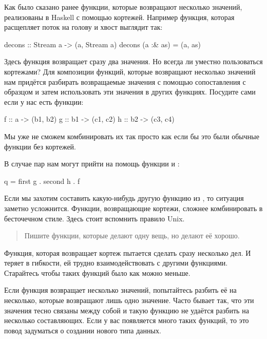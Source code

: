  Как было сказано ранее функции, которые возвращают
несколько значений, реализованы в Haskell с помощью кортежей. Например
функция, которая расщепляет поток на голову и хвост выглядит так:


\begin{code}
decons :: Stream a -> (a, Stream a)
decons (a :& as) = (a, as)
\end{code}

Здесь функция возвращает сразу два значения. Но всегда ли уместно
пользоваться кортежами? Для композиции функций, которые возвращают
несколько значений нам придётся разбирать возвращаемые значения с
помощью сопоставления с образцом и затем использовать эти значения в
других функциях. Посудите сами если у нас есть функции:


\begin{code}
f :: a  -> (b1, b2)
g :: b1 -> (c1, c2)
h :: b2 -> (c3, c4)
\end{code}

Мы уже не сможем комбинировать их так просто как если бы это были
обычные функции без кортежей.



В случае пар нам могут прийти на помощь функции  и
:


\begin{code}
q = first g . second h . f
\end{code}

Если мы захотим составить какую-нибудь другую функцию из , то
ситуация заметно усложнится. Функции, возвращающие кортежи, сложнее
комбинировать в бесточечном стиле. Здесь стоит вспомнить правило Unix.

\begin{quote}
Пишите функции, которые делают одну вещь, но делают её хорошо.
\end{quote}

Функция, которая возвращает кортеж пытается сделать сразу несколько дел.
И теряет в гибкости, ей трудно взаимодействовать с другими функциями.
Старайтесь чтобы таких функций было как можно меньше.

Если функция возвращает несколько значений, попытайтесь разбить её на
несколько, которые возвращают лишь одно значение. Часто бывает так, что
эти значения тесно связаны между собой и такую функцию не удаётся
разбить на несколько составляющих. Если у вас появляется много таких
функций, то это повод задуматься о создании нового типа данных.

